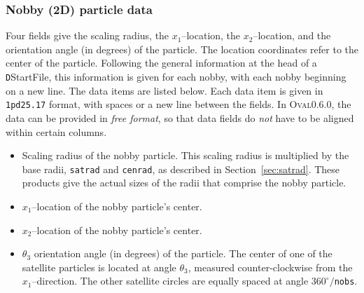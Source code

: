 \documentclass[letterpaper,11pt]{article}
\newcommand{\Oval}{\textsc{Oval}}
\begin{document}
\subsubsection{Nobby (2D) particle data}\label{sec:nobby_data}
Four fields give the scaling radius, 
the $x_{1}$--location, the $x_{2}$--location, and the orientation
angle (in degrees) of the particle.
The location coordinates refer to the center of the particle.
Following the general information at the head of a
\texttt{D}\textsf{StartFile}, this
information is given for each nobby,
with each nobby beginning on a new line.
The data items are listed below.
Each data item is given in \texttt{1pd25.17} format, with
spaces or a new line between the fields.
In \Oval0.6.0, the data can be provided in \emph{free format},
so that data fields do \emph{not} have to be aligned
within certain columns.
\begin{itemize}
\item
Scaling radius of the nobby particle.
This scaling radius is multiplied by the base radii,
\texttt{satrad} and \texttt{cenrad}, as described
in Section~\ref{sec:satrad}.
These products give the actual sizes of the radii that comprise
the nobby particle.
\item
$x_{1}$--location of the nobby particle's center.
\item
$x_{2}$--location of the nobby particle's center.
\item
$\theta_{3}$ orientation angle (in degrees) of the particle.
The center of one of the satellite particles is located at
angle $\theta_{3}$, measured counter-clockwise from the $x_{1}$--direction.
The other satellite circles are equally spaced at angle
\mbox{$360^{\circ}/$\texttt{nobs}}.
\end{itemize}
%
%
\end{document}
